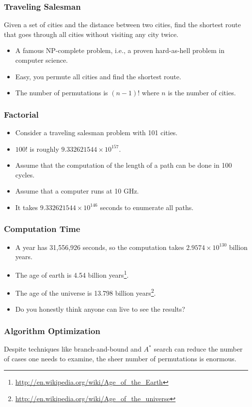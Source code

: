 \documentclass{beamer}
\begin{document}
\begin{CJK}{UTF8}{bsmi}
\begin{frame}
\frametitle{Traveling Salesman} Given a set of cities and the distance
between two cities, find the shortest route that goes through all
cities without visiting any city twice.
\begin{itemize}
\item A famous NP-complete problem, i.e., a proven hard-as-hell problem in computer science.
\item Easy, you permute all cities and find the shortest route.
\item The number of permutations is $(n-1)!$ where $n$ is the
  number of cities.
\end{itemize}
\end{frame}

\begin{frame}
\frametitle{Factorial}
\begin{itemize}
\item Consider a traveling salesman problem with 101 cities.
\item $100!$ is roughly $9.332621544 \times 10^{157}$.
\item Assume that the computation of the length of a path can be done
  in 100 cycles.
\item Assume that a computer runs at 10 GHz.
\item It takes $9.332621544 \times 10^{146}$ seconds to enumerate all
  paths.
\end{itemize}
\end{frame}

\begin{frame}
\frametitle{Computation Time}
\begin{itemize}
\item A year has 31,556,926 seconds, so the computation takes $2.9574
  \times 10^{130}$ billion years.
\item The age of earth is 4.54 billion
  years\footnote{\url{http://en.wikipedia.org/wiki/Age_of_the_Earth}}.
\item The age of the universe is 13.798 billion
  years\footnote{\url{http://en.wikipedia.org/wiki/Age_of_the_universe}}.
\item Do you honestly think anyone can live to see the results?
\end{itemize}
\end{frame}

\begin{frame}
\frametitle{Algorithm Optimization} Despite techniques like
branch-and-bound and $A^*$ search can reduce the number of cases one
needs to examine, the sheer number of permutations is enormous.
\end{frame}


\end{CJK}
\end{document}
